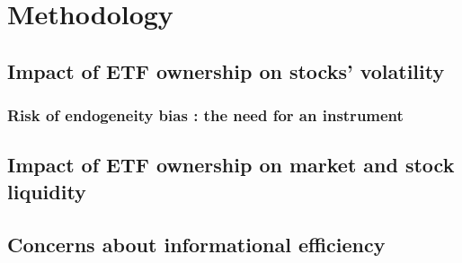 \section{Methodology}
\subsection{Impact of ETF ownership on stocks' volatility}

\subsubsection{Risk of endogeneity bias : the need for an instrument}
\subsection{Impact of ETF ownership on market and stock liquidity}

\subsection{Concerns about informational efficiency}
